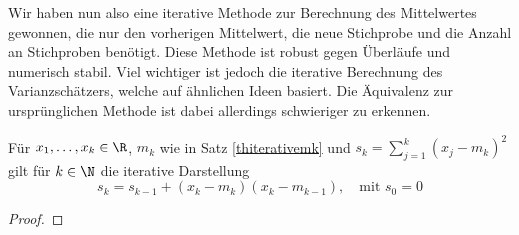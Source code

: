 Wir haben nun also eine iterative Methode zur Berechnung des Mittelwertes gewonnen, die nur den vorherigen Mittelwert, die neue Stichprobe und die Anzahl an Stichproben benötigt. Diese Methode ist robust gegen Überläufe und numerisch stabil. Viel wichtiger ist jedoch die iterative Berechnung des Varianzschätzers, welche auf ähnlichen Ideen basiert. Die Äquivalenz zur ursprünglichen Methode ist dabei allerdings schwieriger zu erkennen.
\begin{maththeorem}
Für $x_1,\dots,x_k\in\R$, $m_k$ wie in Satz \ref{thiterativemk} und $s_k=\sum_{j=1}^k(x_j-m_k)^2$ gilt für $k\in\N$ die iterative Darstellung
\[s_k=s_{k-1}+(x_k-m_k)(x_k-m_{k-1}),\quad\text{mit }s_0=0\]
\end{maththeorem}
\begin{proof}
\end{proof}

